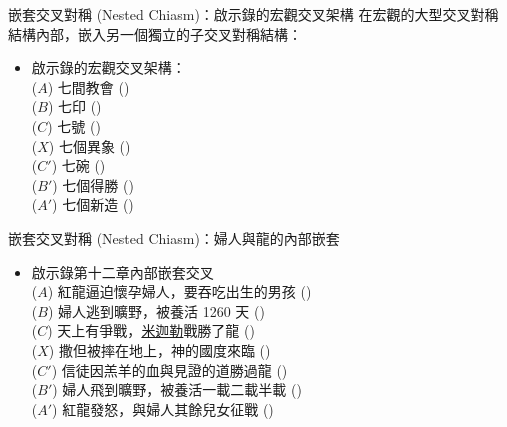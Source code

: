 \documentclass{beamer}
\begin{document}
\begin{frame}{嵌套交叉對稱 (Nested Chiasm)：啟示錄的宏觀交叉架構}
  在宏觀的大型交叉對稱結構內部，嵌入另一個獨立的子交叉對稱結構：
  \begin{itemize}
    \item 啟示錄的宏觀交叉架構\parencite{RevelationSevenSeven}：\\
      \quad($A$) 七間教會 ()\\
      \quad\quad($B$) 七印 ()\\
      \quad\quad\quad($C$) 七號 ()\\
      \quad\quad\quad\quad($X$) 七個異象 ()\\
      \quad\quad\quad($C'$) 七碗 ()\\
      \quad\quad($B'$) 七個得勝 ()\\
      \quad($A'$) 七個新造 ()
  \end{itemize}
\end{frame}

\begin{frame}{嵌套交叉對稱 (Nested Chiasm)：婦人與龍的內部嵌套}
  \begin{itemize}
    \item 啟示錄第十二章內部嵌套交叉\\
      \quad($A$) 紅龍逼迫懷孕婦人，要吞吃出生的男孩 ()\\
      \quad\quad($B$) 婦人逃到曠野，被養活 1260 天 ()\\
      \quad\quad\quad($C$) 天上有爭戰，\uline{米迦勒}戰勝了龍 ()\\
      \quad\quad\quad\quad($X$) 撒但被摔在地上，神的國度來臨 ()\\
      \quad\quad\quad($C'$) 信徒因羔羊的血與見證的道勝過龍 ()\\
      \quad\quad($B'$) 婦人飛到曠野，被養活一載二載半載 ()\\
      \quad($A'$) 紅龍發怒，與婦人其餘兒女征戰 ()\\
  \end{itemize}
\end{frame}
\end{document}
